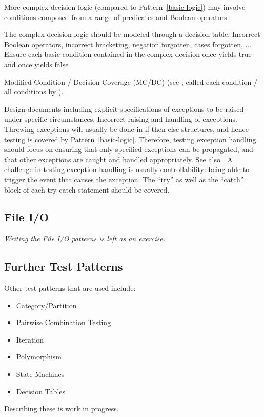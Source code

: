 \documentclass{article}
\begin{document}
More complex decision logic (compared to Pattern~\ref{basic-logic})
may involve conditions composed from a range of predicates and
Boolean operators. 
\begin{itemize}
\model
  The complex decision logic should be modeled through a decision table.
\faults
  Incorrect Boolean operators, incorrect bracketing, negation forgotten,
  cases forgotten, ...
\strategy
  Ensure each basic condition contained in the complex decision
   once yields true and once yields false
\begin{sloppypar}
\adequacy
  Modified Condition / Decision Coverage (MC/DC)
  (see \cite[Section 12.4, 14.3]{Pezze:2008}; called each-condition / all conditions
  by \cite{Binder:2000}).
\end{sloppypar}
\end{itemize}

\begin{itemize}
\model
  Design documents including explicit 
  specifications of exceptions to be raised under specific circumstances.
\faults
  Incorrect raising and handling of exceptions.
\strategy
  Throwing exceptions will usually be done in if-then-else structures,
  and hence testing is covered by Pattern~\ref{basic-logic}.
  Therefore, testing exception handling should focus on ensuring that
  only specified exceptions can be propagated, and that other
  exceptions are caught and handled appropriately.
  See also \cite[Section 15.12]{Pezze:2008}.
  A challenge in testing exception handling is usually controllability:
  being able to trigger the event that causes the exception.
\adequacy
  The ``try'' as well as the ``catch'' block of each try-catch
  statement should be covered.
\end{itemize}

\subsection{File I/O}

\emph{Writing the File I/O patterns is left as an exercise.}



\subsection{Further Test Patterns}

Other test patterns that are used include:
\begin{itemize}
\item Category/Partition
\item Pairwise Combination Testing
\item Iteration
\item Polymorphism
\item State Machines
\item Decision Tables
\end{itemize}
Describing these is work in progress.
\end{document}
